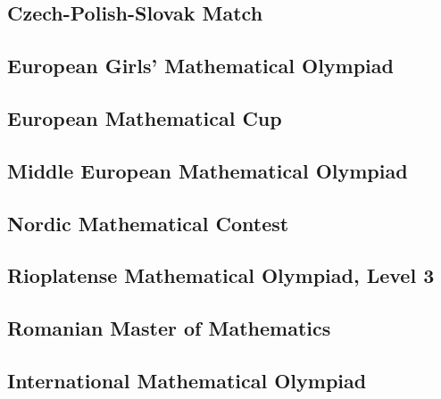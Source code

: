 \documentclass[../the-book.tex]{subfiles}
\begin{document}


\subsection*{Czech-Polish-Slovak Match}



\subsection*{European Girls' Mathematical Olympiad}



\subsection*{European Mathematical Cup}




\subsection*{Middle European Mathematical Olympiad}





\subsection*{Nordic Mathematical Contest}



\subsection*{Rioplatense Mathematical Olympiad, Level 3}



\subsection*{Romanian Master of Mathematics}




\subsection*{International Mathematical Olympiad}









\end{document}
